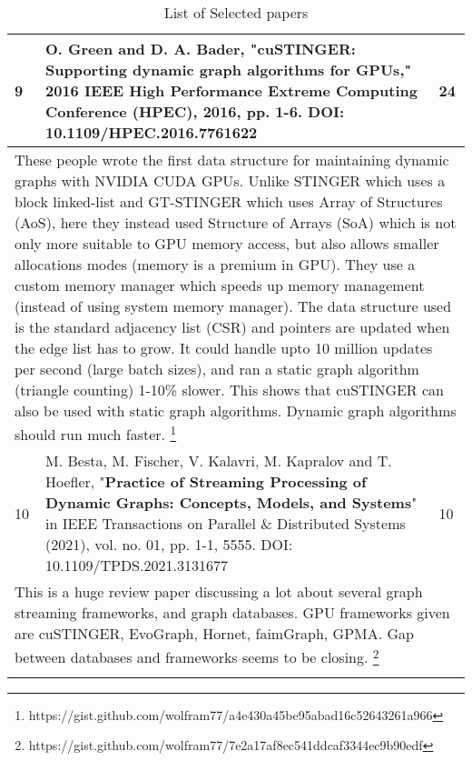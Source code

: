 \begin{longtable}[!hbtp]{|p{1cm}|p{11cm}|p{2cm}|}
  9 &
  O. Green and D. A. Bader, "\textbf{cuSTINGER: Supporting dynamic graph algorithms for GPUs}," 2016 IEEE High Performance Extreme Computing Conference (HPEC), 2016, pp. 1-6.\linebreak
  DOI: 10.1109/HPEC.2016.7761622 &
  24 \\ \hline
  \multicolumn{3}{|p{14cm}|}{These people wrote the first data structure for maintaining dynamic graphs with NVIDIA CUDA GPUs. Unlike STINGER which uses a block linked-list and GT-STINGER which uses Array of Structures (AoS), here they instead used Structure of Arrays (SoA) which is not only more suitable to GPU memory access, but also allows smaller allocations modes (memory is a premium in GPU). They use a custom memory manager which speeds up memory management (instead of using system memory manager). The data structure used is the standard adjacency list (CSR) and pointers are updated when the edge list has to grow. It could handle upto 10 million updates per second (large batch sizes), and ran a static graph algorithm (triangle counting) 1-10\% slower. This shows that cuSTINGER can also be used with static graph algorithms. Dynamic graph algorithms should run much faster. \footnote{https://gist.github.com/wolfram77/a4e430a45be95abad16c52643261a966}} \\ \hline

  10 &
  M. Besta, M. Fischer, V. Kalavri, M. Kapralov and T. Hoefler, "\textbf{Practice of Streaming Processing of Dynamic Graphs: Concepts, Models, and Systems}" in IEEE Transactions on Parallel \& Distributed Systems (2021), vol. no. 01, pp. 1-1, 5555.\linebreak
  DOI: 10.1109/TPDS.2021.3131677 &
  10 \\ \hline
  \multicolumn{3}{|p{14cm}|}{This is a huge review paper discussing a lot about several graph streaming frameworks, and graph databases. GPU frameworks given are cuSTINGER, EvoGraph, Hornet, faimGraph, GPMA. Gap between databases and frameworks seems to be closing. \footnote{https://gist.github.com/wolfram77/7e2a17af8ec541ddcaf3344ec9b90edf}} \\ \hline

\caption{List of Selected papers}
\label{tab:papers}
\end{longtable}
